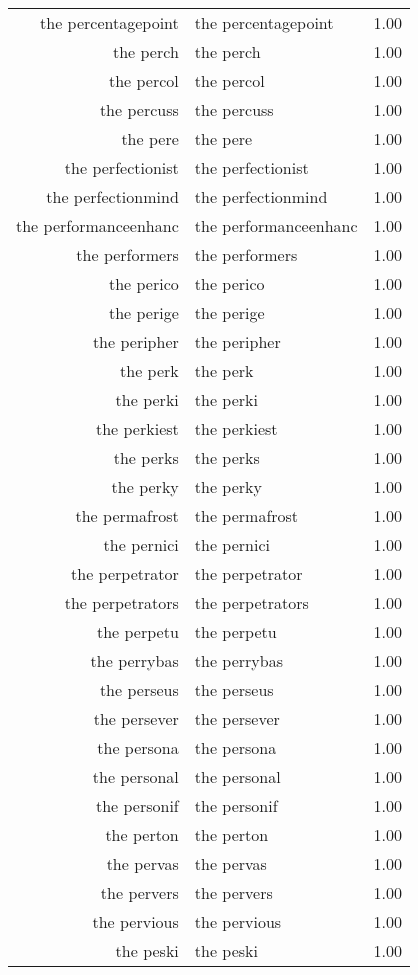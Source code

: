 \begin{table}[ht]
\begin{tabular}{rlr}
  the percentagepoint & the percentagepoint & 1.00 \\ 
  the perch & the perch & 1.00 \\ 
  the percol & the percol & 1.00 \\ 
  the percuss & the percuss & 1.00 \\ 
  the pere & the pere & 1.00 \\ 
  the perfectionist & the perfectionist & 1.00 \\ 
  the perfectionmind & the perfectionmind & 1.00 \\ 
  the performanceenhanc & the performanceenhanc & 1.00 \\ 
  the performers & the performers & 1.00 \\ 
  the perico & the perico & 1.00 \\ 
  the perige & the perige & 1.00 \\ 
  the peripher & the peripher & 1.00 \\ 
  the perk & the perk & 1.00 \\ 
  the perki & the perki & 1.00 \\ 
  the perkiest & the perkiest & 1.00 \\ 
  the perks & the perks & 1.00 \\ 
  the perky & the perky & 1.00 \\ 
  the permafrost & the permafrost & 1.00 \\ 
  the pernici & the pernici & 1.00 \\ 
  the perpetrator & the perpetrator & 1.00 \\ 
  the perpetrators & the perpetrators & 1.00 \\ 
  the perpetu & the perpetu & 1.00 \\ 
  the perrybas & the perrybas & 1.00 \\ 
  the perseus & the perseus & 1.00 \\ 
  the persever & the persever & 1.00 \\ 
  the persona & the persona & 1.00 \\ 
  the personal & the personal & 1.00 \\ 
  the personif & the personif & 1.00 \\ 
  the perton & the perton & 1.00 \\ 
  the pervas & the pervas & 1.00 \\ 
  the pervers & the pervers & 1.00 \\ 
  the pervious & the pervious & 1.00 \\ 
  the peski & the peski & 1.00 \\ 

\end{tabular}
\end{table}
